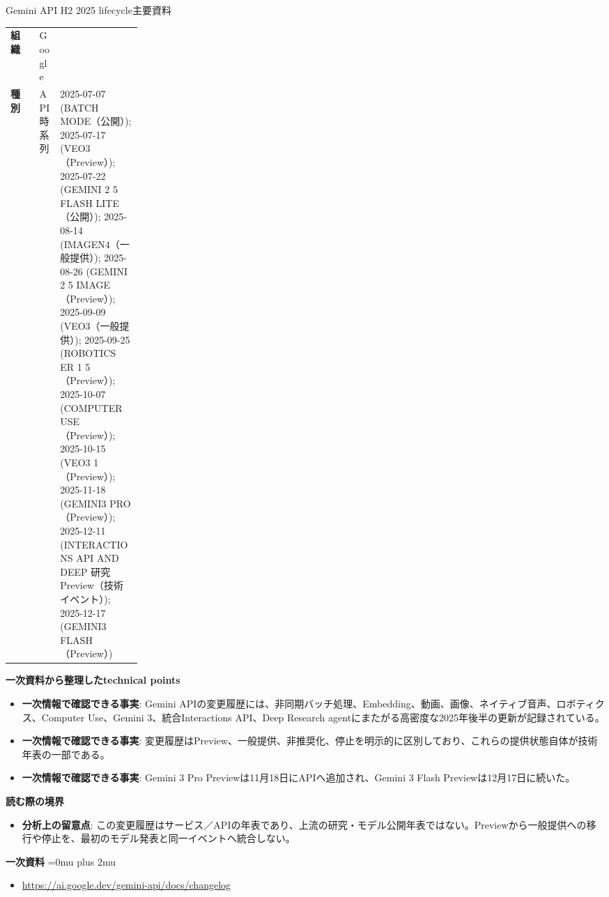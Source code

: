 \begin{technicalnote}{Gemini API H2 2025 lifecycle}{主要資料}
\begingroup
\begin{tabularx}{\linewidth}{@{}>{\bfseries}p{0.22\linewidth}X@{}}
組織 & Google \\
種別 & API
時系列 & 2025-07-07 (BATCH MODE（公開）); 2025-07-17 (VEO3（Preview）); 2025-07-22 (GEMINI 2 5 FLASH LITE（公開）); 2025-08-14 (IMAGEN4（一般提供）); 2025-08-26 (GEMINI 2 5 IMAGE（Preview）); 2025-09-09 (VEO3（一般提供）); 2025-09-25 (ROBOTICS ER 1 5（Preview）); 2025-10-07 (COMPUTER USE（Preview）); 2025-10-15 (VEO3 1（Preview）); 2025-11-18 (GEMINI3 PRO（Preview）); 2025-12-11 (INTERACTIONS API AND DEEP 研究Preview（技術イベント）); 2025-12-17 (GEMINI3 FLASH（Preview）) \\
\end{tabularx}
\smallskip
{\bfseries 一次資料から整理したtechnical points}
\begin{itemize}[leftmargin=1.5em,itemsep=0.35em]
\item \textbf{一次情報で確認できる事実}: Gemini APIの変更履歴には、非同期バッチ処理、Embedding、動画、画像、ネイティブ音声、ロボティクス、Computer Use、Gemini 3、統合Interactions API、Deep Research agentにまたがる高密度な2025年後半の更新が記録されている。
\item \textbf{一次情報で確認できる事実}: 変更履歴はPreview、一般提供、非推奨化、停止を明示的に区別しており、これらの提供状態自体が技術年表の一部である。
\item \textbf{一次情報で確認できる事実}: Gemini 3 Pro Previewは11月18日にAPIへ追加され、Gemini 3 Flash Previewは12月17日に続いた。
\end{itemize}
\begin{minipage}{\linewidth}
{\bfseries 読む際の境界}
\begin{itemize}[leftmargin=1.5em,itemsep=0.35em]
\item \textbf{分析上の留意点}: この変更履歴はサービス／APIの年表であり、上流の研究・モデル公開年表ではない。Previewから一般提供への移行や停止を、最初のモデル発表と同一イベントへ統合しない。
\end{itemize}
\begin{samepage}
{\bfseries 一次資料}
\begingroup\sloppy
\Urlmuskip=0mu plus 2mu\relax
\begin{itemize}[leftmargin=1.5em,itemsep=0.25em]
\item {\scriptsize\url{https://ai.google.dev/gemini-api/docs/changelog}}
\end{itemize}
\endgroup
\end{samepage}
\end{minipage}
\endgroup
\end{technicalnote}
\medskip

